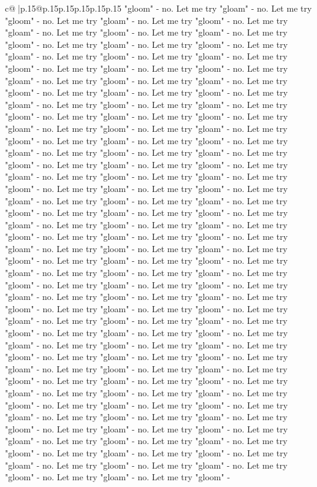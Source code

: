 \documentclass{article}
\begin{document}
{\begin{supertabular}{c@{$\;$}|p{.15\linewidth}@{}p{.15\linewidth}p{.15\linewidth}p{.15\linewidth}p{.15\linewidth}p{.15\linewidth}}
{{{"gloom" {-} no. Let me try "gloam" {-} no. Let me try "gloom" {-} no. Let me try "gloam" {-} no. Let me try "gloom" {-} no. Let me try "gloam" {-} no. Let me try "gloom" {-} no. Let me try "gloam" {-} no. Let me try "gloom" {-} no. Let me try "gloam" {-} no. Let me try "gloom" {-} no. Let me try "gloam" {-} no. Let me try "gloom" {-} no. Let me try "gloam" {-} no. Let me try "gloom" {-} no. Let me try "gloam" {-} no. Let me try "gloom" {-} no. Let me try "gloam" {-} no. Let me try "gloom" {-} no. Let me try "gloam" {-} no. Let me try "gloom" {-} no. Let me try "gloam" {-} no. Let me try "gloom" {-} no. Let me try "gloam" {-} no. Let me try "gloom" {-} no. Let me try "gloam" {-} no. Let me try "gloom" {-} no. Let me try "gloam" {-} no. Let me try "gloom" {-} no. Let me try "gloam" {-} no. Let me try "gloom" {-} no. Let me try "gloam" {-} no. Let me try "gloom" {-} no. Let me try "gloam" {-} no. Let me try "gloom" {-} no. Let me try "gloam" {-} no. Let me try "gloom" {-} no. Let me try "gloam" {-} no. Let me try "gloom" {-} no. Let me try "gloam" {-} no. Let me try "gloom" {-} no. Let me try "gloam" {-} no. Let me try "gloom" {-} no. Let me try "gloam" {-} no. Let me try "gloom" {-} no. Let me try "gloam" {-} no. Let me try "gloom" {-} no. Let me try "gloam" {-} no. Let me try "gloom" {-} no. Let me try "gloam" {-} no. Let me try "gloom" {-} no. Let me try "gloam" {-} no. Let me try "gloom" {-} no. Let me try "gloam" {-} no. Let me try "gloom" {-} no. Let me try "gloam" {-} no. Let me try "gloom" {-} no. Let me try "gloam" {-} no. Let me try "gloom" {-} no. Let me try "gloam" {-} no. Let me try "gloom" {-} no. Let me try "gloam" {-} no. Let me try "gloom" {-} no. Let me try "gloam" {-} no. Let me try "gloom" {-} no. Let me try "gloam" {-} no. Let me try "gloom" {-} no. Let me try "gloam" {-} no. Let me try "gloom" {-} no. Let me try "gloam" {-} no. Let me try "gloom" {-} no. Let me try "gloam" {-} no. Let me try "gloom" {-} no. Let me try "gloam" {-} no. Let me try "gloom" {-} no. Let me try "gloam" {-} no. Let me try "gloom" {-} no. Let me try "gloam" {-} no. Let me try "gloom" {-} no. Let me try "gloam" {-} no. Let me try "gloom" {-} no. Let me try "gloam" {-} no. Let me try "gloom" {-} no. Let me try "gloam" {-} no. Let me try "gloom" {-} no. Let me try "gloam" {-} no. Let me try "gloom" {-} no. Let me try "gloam" {-} no. Let me try "gloom" {-} no. Let me try "gloam" {-} no. Let me try "gloom" {-} no. Let me try "gloam" {-} no. Let me try "gloom" {-} no. Let me try "gloam" {-} no. Let me try "gloom" {-} no. Let me try "gloam" {-} no. Let me try "gloom" {-} no. Let me try "gloam" {-} no. Let me try "gloom" {-} no. Let me try "gloam" {-} no. Let me try "gloom" {-} no. Let me try "gloam" {-} no. Let me try "gloom" {-} no. Let me try "gloam" {-} no. Let me try "gloom" {-} no. Let me try "gloam" {-} no. Let me try "gloom" {-} no. Let me try "gloam" {-} no. Let me try "gloom" {-} no. Let me try "gloam" {-} no. Let me try "gloom" {-} no. Let me try "gloam" {-} no. Let me try "gloom" {-} no. Let me try "gloam" {-} no. Let me try "gloom" {-} no. Let me try "gloam" {-} no. Let me try "gloom" {-} no. Let me try "gloam" {-} no. Let me try "gloom" {-} }}}
\end{supertabular}}
\end{document}
